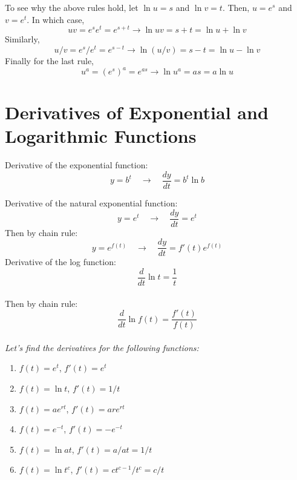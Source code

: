 \documentclass{./../../latex/handout}
\begin{document}
To see why the above rules hold, let $\ln u = s$ and $\ln v = t$. Then, $u=e^s$ and $v=e^t$. In which case,
\[ uv = e^s e^t = e^{s+t} \rightarrow \ln uv =s+t = \ln u + \ln v \]
Similarly, 
\[ u/v = e^s/e^t = e^{s-t} \rightarrow \ln (u/v) =s-t = \ln u - \ln v \]
Finally for the last rule, 
\[u^a = (e^s)^a=e^{as} \rightarrow \ln u^a = as = a\ln u \]

\section{Derivatives of Exponential and Logarithmic Functions}
Derivative of the exponential function:
\[ y=b^{t} \quad \rightarrow \quad \frac{dy}{dt} = b^t \ln b  \]

Derivative of the natural exponential function:
\[ y=e^t \quad \rightarrow \quad \frac{dy}{dt} = e^t \]
Then by chain rule:
 \[y=e^{f(t)} \quad \rightarrow \quad \frac{dy}{dt} = f'(t) e^{f(t)}\]
 Derivative of the log function:
 \[ \frac{d}{d t} \ln t =\frac{1}{t} \] \\
 Then by chain rule:
 \[ \frac{d}{d t} \ln f(t) =\frac{f'(t)}{f(t)} \] \\
 
\textit{Let's find the derivatives for the following functions:}
\begin{enumerate}
\item $f(t)=e^t$, $f'(t) = e^t$
\item $f(t)=\ln t$, $f'(t) = 1/t$
\item $f(t)=ae^{rt}$, $f'(t) = are^{rt}$
\item $f(t)=e^{-t}$, $f'(t) = -e^{-t}$
\item $f(t)=\ln a t$, $f'(t) = a/at = 1/t$
\item $f(t)=\ln t^{c}$, $f'(t) = ct^{c-1}/t^c = c/t$
\end{enumerate}
\end{document}
